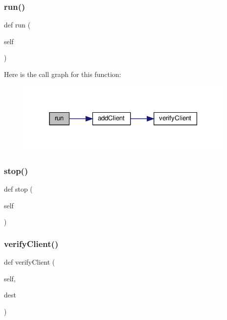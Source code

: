 \subsubsection{\texorpdfstring{run()}{run()}}
{\footnotesize\ttfamily def run (\begin{DoxyParamCaption}\item[{}]{self }\end{DoxyParamCaption})}

Here is the call graph for this function\+:
\nopagebreak
\begin{figure}[H]
\begin{center}
\leavevmode
\includegraphics[width=306pt]{class_client_1_1_client_reseiver_ad22709b2e67308af35f55680d5a026e0_cgraph}
\end{center}
\end{figure}
\mbox{\label{class_client_1_1_client_reseiver_a26ca7c1c7fcdd35378e7be97727047a6}} 
\subsubsection{\texorpdfstring{stop()}{stop()}}
{\footnotesize\ttfamily def stop (\begin{DoxyParamCaption}\item[{}]{self }\end{DoxyParamCaption})}

\mbox{\label{class_client_1_1_client_reseiver_aa5069a51ca05aeb44e006dba3be07296}} 
\subsubsection{\texorpdfstring{verify\+Client()}{verifyClient()}}
{\footnotesize\ttfamily def verify\+Client (\begin{DoxyParamCaption}\item[{}]{self,  }\item[{}]{dest }\end{DoxyParamCaption})}

